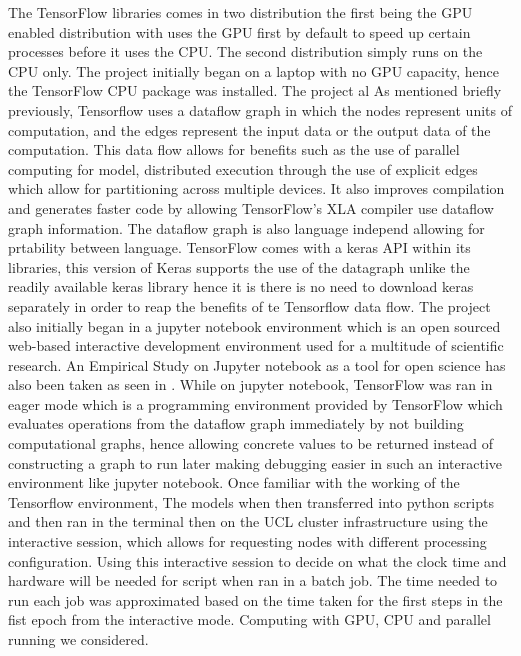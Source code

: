 The TensorFlow libraries comes in two distribution the first being the GPU enabled distribution with uses the GPU first by default to speed up certain processes before it uses the CPU.
The second distribution simply runs on the CPU only.
The project initially began on a laptop with no GPU capacity, hence the TensorFlow CPU package was installed. The project al
As mentioned briefly previously, Tensorflow uses a dataflow graph in which the nodes represent units of computation, and the edges represent the input data or the output data of the computation. This data flow allows for benefits such as the use of parallel computing for model, distributed execution through the use of explicit edges which allow for partitioning across multiple devices. It also improves compilation and generates faster code by allowing TensorFlow's XLA compiler use dataflow graph information. The dataflow graph is also language independ allowing for prtability between language.
TensorFlow comes with a keras API within its libraries, this version of Keras supports the use of the datagraph unlike the readily available keras library hence it is there is no need to download keras separately in order to reap the benefits of te Tensorflow data flow.
The project also initially began in a jupyter notebook environment which is an open sourced web-based interactive development environment used for a multitude of scientific research. An Empirical Study on Jupyter notebook as a tool for open science has also been taken as seen in \citep{Randles_2017}. While on jupyter notebook, TensorFlow was ran in eager mode which is a programming environment provided by TensorFlow which evaluates operations from the dataflow graph immediately by not building computational graphs, hence allowing concrete values to be returned instead of constructing a graph to run later making debugging easier in such an interactive environment like jupyter notebook.
Once familiar with the working of the Tensorflow environment, The models when then transferred into python scripts and then ran in the terminal then on the UCL cluster infrastructure using the interactive session, which allows for requesting nodes with different processing configuration. Using this interactive session to decide on what the clock time and hardware will be needed for script when ran in a batch job. The time needed to run each job was approximated based on the time taken for the first steps in the fist epoch from the interactive mode. Computing with GPU, CPU and parallel running we considered.


